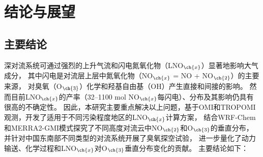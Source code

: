 
\chapter{结论与展望}

\section{主要结论}

深对流系统可通过强烈的上升气流和闪电氮氧化物（LNO$_{\ch{x}}$）显著地影响大气成分，
其中闪电是对流层上层中氮氧化物（NO$_{\ch{x}}$ = NO + NO$_{\ch{2}}$）的主要来源，
对臭氧（O$_{\ch{3}}$）化学和羟基自由基（OH）产生直接和间接的影响。
然而目前LNO$_{\ch{x}}$的产率（32--1100 mol NO$_{\ch{x}}$每闪电）、分布及其影响仍具有很高的不确定性。
因此，本研究主要重点解决以上问题，基于OMI和TROPOMI观测，开发了适用于不同污染程度地区的LNO$_{\ch{x}}$计算方案，
结合WRF-Chem和MERRA2-GMI模式探究了不同高度对流云中NO$_{\ch{2}}$和O$_{\ch{3}}$的垂直分布，
并针对中国东南部不同类型的对流系统开展了臭氧探空试验，
进一步量化了动力输送、化学过程和LNO$_{\ch{x}}$对O$_{\ch{3}}$垂直分布变化的贡献。
主要结论如下：

